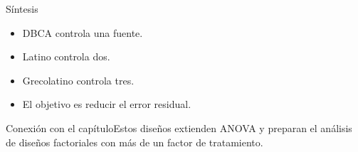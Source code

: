 \documentclass[10pt,aspectratio=169]{beamer}
\begin{document}
\begin{frame}{Síntesis}\small\begin{itemize}\item DBCA controla una fuente.\item Latino controla dos.\item Grecolatino controla tres.\item El objetivo es reducir el error residual.\end{itemize}\end{frame}
\begin{frame}{Conexión con el capítulo}\small Estos diseños extienden ANOVA y preparan el análisis de diseños factoriales con más de un factor de tratamiento.\end{frame}
\end{document}
